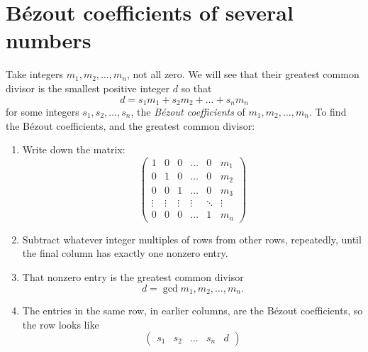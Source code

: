 \section{B\'ezout coefficients of several numbers}
Take integers \(m_1, m_2, \dots, m_n\), not all zero.
We will see that their greatest common divisor is the smallest positive integer \(d\) so that
\[
d = s_1 m_1 + s_2 m_2 + \dots + s_n m_n
\]
for some integers \(s_1, s_2, \dots, s_n\), the \emph{B\'ezout coefficients} of \(m_1, m_2, \dots, m_n\).
To find the B\'ezout coefficients, and the greatest common divisor:
\begin{enumerate}
\item
Write down the matrix:
\[
\begin{pmatrix}
1 & 0 & 0 & \dots & 0 & m_1 \\
0 & 1 & 0 & \dots & 0 & m_2 \\
0 & 0 & 1 & \dots & 0 & m_3 \\
\vdots & \vdots & \vdots & \vdots & \ddots & \vdots \\
0 & 0 & 0 & \dots & 1 & m_n
\end{pmatrix}
\]
\item
Subtract whatever integer multiples of rows from other rows, repeatedly, until the final column has exactly one nonzero entry.
\item
That nonzero entry is the greatest common divisor 
\[
d=\gcd{m_1, m_2, \dots, m_n}.
\]
\item
The entries in the same row, in earlier columns, are the B\'ezout coefficients, so the row looks like
\[
\begin{pmatrix}
s_1 & s_2 & \dots & s_n & d
\end{pmatrix}
\]
\end{enumerate}

